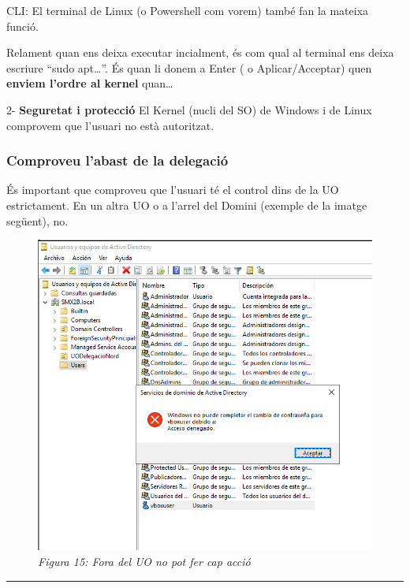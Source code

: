 \documentclass[
  a4paper,
]{article}
\begin{document}
CLI: El terminal de Linux (o Powershell com vorem) també fan la mateixa
funció.

Relament quan ens deixa executar incialment, és com qual al terminal ens
deixa escriure ``sudo apt\ldots{}''. És quan li donem a Enter ( o
Aplicar/Acceptar) quen \textbf{enviem l'ordre al kernel} quan\ldots{}

2- \textbf{Seguretat i protecció} El Kernel (nucli del SO) de Windows i
de Linux comprovem que l'usuari no està autoritzat.

\subsubsection{Comproveu l'abast de la
delegació}\label{comproveu-labast-de-la-delegaciuxf3}

És important que comproveu que l'usuari té el control dins de la UO
estrictament. En un altra UO o a l'arrel del Domini (exemple de la
imatge següent), no.

\begin{figure}
\centering
\includegraphics{png/NoTienePrivilegios.png}
\caption{\emph{Figura 15: Fora del UO no pot fer cap acció}}
\end{figure}

\begin{center}\rule{0.5\linewidth}{0.5pt}\end{center}
\end{document}
